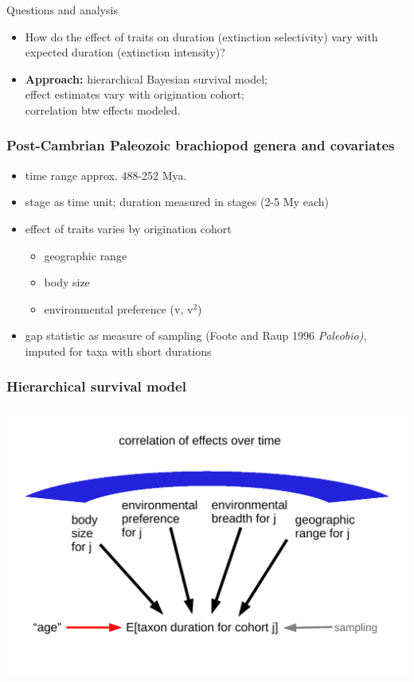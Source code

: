 \documentclass{beamer}
\begin{document}
\begin{frame}
  \begin{alertblock}{Questions and analysis}
    \begin{itemize}
      \item How do the effect of traits on duration (\alert{extinction selectivity}) vary with expected duration (\alert{extinction intensity})?
      \item \textbf{Approach:} hierarchical Bayesian survival model; \\effect estimates vary with origination cohort; \\correlation btw effects modeled.
    \end{itemize}
  \end{alertblock}
\end{frame}

\begin{frame}
  \frametitle{Post-Cambrian Paleozoic brachiopod genera and covariates}
  \begin{itemize}
    \item time range approx. 488-252 Mya.
    \item stage as time unit; duration measured in stages (2-5 My each)
    \item effect of traits varies by origination cohort
      \begin{itemize}
        \item geographic range
        \item body size
        \item environmental preference (v, v\(^2\))
      \end{itemize}
    \item gap statistic as measure of sampling {\footnotesize{(Foote and Raup 1996 \em{Paleobio})}}, imputed for taxa with short durations
  \end{itemize}
\end{frame}

\begin{frame}
  \frametitle{Hierarchical survival model}
  \begin{center}
    \includegraphics[width = \textwidth,height = 0.8\textheight,keepaspectratio = true]{figure/simple_model}
  \end{center}
\end{frame}
\end{document}
